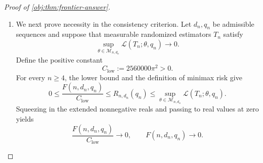 \documentclass[11pt]{article}
\begin{document}
\begin{proof}[Proof of \cref{obj:thm:frontier-answer}]
\begin{enumerate}
The baseline density in \cref{obj:def:block-prior} vanishes outside
\([-1/4,1/4]\), so \(|U_\ell|\le1/4\) almost surely for every block. For either
\(\sigma\in\{-1,1\}\), each recipient \(i\in C_\ell\) consequently satisfies
\[
|a_i|+|t_i|+\sum_{j:(j,i)\in G}|b_{ij}|
=
\left|U_\ell-\frac{\sigma h}{2}\right|
+d\frac hd
\le\frac14+\frac{3h}{2}
\le1.
\]
Source and padding rows have coefficient mass zero. Thus both priors are supported on \(\mathcal M_{n,d}\). Summing the spillover contributions by source gives their constant targets:
\[
\tau(\theta)
=\frac1n\sum_{j=1}^{m}\sum_{i:(j,i)\in G}\frac{\sigma h}{d}
=\frac1n\sum_{j=1}^{m}\sigma h
=\frac{\sigma mh}{n}
=\sigma\Delta.
\]

The record maps are jointly measurable: their graph and assignment coordinates are finite, and their outcome coordinates are affine in the baselines. The canonical product design and \(2Bd\le n\) satisfy the hypotheses of \cref{obj:thm:block-testing-scale}, which supplies
\[
\operatorname{TV}(P_{+1,h},P_{-1,h})\le\frac12.
\]
Applying \cref{obj:lem:full-record-two-prior-risk} to these supported priors yields
\[
R_{n,d}(q)
\ge
\frac{\Delta^2}{2}
\left(1-\operatorname{TV}(P_{+1,h},P_{-1,h})\right)
\ge
\frac{\Delta^2}{4}
=
\frac14\left(\frac{m\kappa s}{n}\right)^2.
\]
This bound applies to the full class of measurable randomized estimators in
\cref{obj:def:risk}.

Finally, \(m/n\ge1/4\) gives
\[
\frac{\kappa s}{4}\le\frac{m\kappa s}{n},
\qquad
\frac14\left(\frac{\kappa s}{4}\right)^2
=\frac{s^2}{640000\pi^2}.
\]
Combining the preceding inequalities,
\[
\frac{F(n,d,q)}{2560000\pi^2}
\le
\frac{s^2}{2560000\pi^2}
\le
\frac{s^2}{640000\pi^2}
\le
\frac14\left(\frac{m\kappa s}{n}\right)^2
\le R_{n,d}(q).
\]
Together with the large-degree case and the upper bound, this proves the displayed risk chain.

\item We next prove necessity in the consistency criterion. Let \(d_n,q_n\) be admissible sequences and suppose that measurable randomized estimators \(T_n\) satisfy
\[
\sup_{\theta\in\mathcal M_{n,d_n}}
\mathcal L(T_n;\theta,q_n)\longrightarrow0.
\]
Define the positive constant
\[
C_{\mathrm{low}}:=2560000\pi^2>0.
\]
For every \(n\ge4\), the lower bound and the definition of minimax risk give
\[
0\le
\frac{F(n,d_n,q_n)}{C_{\mathrm{low}}}
\le R_{n,d_n}(q_n)
\le
\sup_{\theta\in\mathcal M_{n,d_n}}
\mathcal L(T_n;\theta,q_n).
\]
Squeezing in the extended nonnegative reals and passing to real values at zero yields
\[
\frac{F(n,d_n,q_n)}{C_{\mathrm{low}}}\longrightarrow0,
\qquad
F(n,d_n,q_n)\longrightarrow0.
\]


\end{enumerate}
\end{proof}
\end{document}
